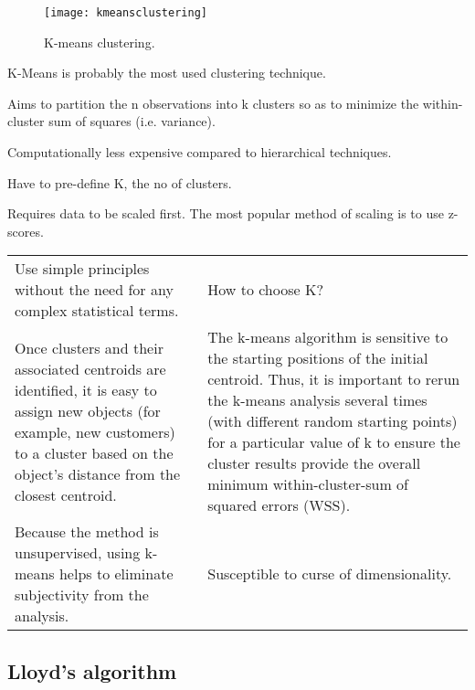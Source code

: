 	\begin{figure}[h]
		\centering
		\texttt{[image: kmeansclustering]}
		\caption{K-means clustering.}
		\label{fig:kmeansclustering}
	\end{figure}


	\begin{bulletedlist}
		\item K-Means is probably the most used clustering technique.
		\item Aims to partition the n observations into k clusters so as to minimize the within-cluster sum of squares (i.e. variance).
		\item Computationally less expensive compared to hierarchical techniques.
		\item Have to pre-define K, the no of clusters.
		\item Requires data to be scaled first.  The most popular method of scaling is to use z-scores.
	\end{bulletedlist}


	\begin{table}
		\begin{tabular}{|p{}|p{}|} \hline
			\tablecolumnheadervlinesone{Strengths} & \tablecolumnheadervlinestwo{Weakness} \\ \hline
			Use simple principles without the need for any complex statistical terms. &
			How to choose K? \\ \hline
			Once clusters and their associated centroids are identified, it is easy to assign new objects (for example, new customers) to a cluster based on the object's distance from the closest centroid. &
			The k-means algorithm is sensitive to the starting positions of the initial centroid. Thus, it is important to rerun the k-means analysis several times (with different random starting points) for a particular value of k to ensure the cluster results provide the overall minimum within-cluster-sum of squared errors (WSS). \\ \hline
			Because the method is unsupervised, using k-means helps to eliminate subjectivity from the analysis. &
			Susceptible to curse of dimensionality. \\ \hline
		\end{tabular}
	\end{table}

	\subsection{Lloyd's algorithm}

